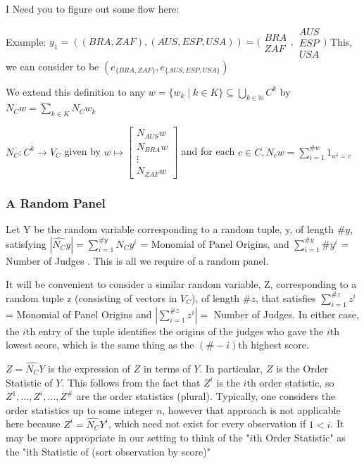 \documentclass{article}
\begin{document}
I Need you to figure out some flow here:

Example:
\( y_1 = (( BRA, ZAF) ,(AUS, ESP, USA)) = \bigg( \begin{matrix} BRA \\ ZAF \end{matrix}, \begin{matrix} AUS \\ ESP \\ USA \end{matrix}\bigg) \)  
This, we can consider to be $(e_{\{BRA,ZAF\}},e_{\{AUS,ESP,USA\}})$

We extend this definition to any $w =\{w_k \mid k \in K\} \subseteq \bigcup_{k\in\mathbb{N}} C^k $ by $N_C w = \sum_{k\in K} N_C w_k$

$N_C: C^k \rightarrow V_C $ given by $ w \mapsto \begin{bmatrix} N_{AUS}w \\ N_{BRA}w \\ \vdots \\ N_{ZAF}w \end{bmatrix} $ and for each $ c \in C, N_cw = \sum_{i=1}^{\#w} 1_{w^i = c} $

\subsubsection{A Random Panel}
Let Y be the random variable corresponding to a random tuple, y, of length $\#y$, satisfying $ |\hat{N_C}y|=\sum_{i=1}^{\#y} N_C y^i$ = Monomial of Panel Origins, and $\sum_{i=1}^{\#y} \#y^i $ = Number of Judges . This is all we require of a random panel. 

It will be convenient to consider a similar random variable, Z, corresponding to a random tuple z (consisting of vectors in $V_C$), of length $\#z$, that satisfies $\sum_{i=1}^{\#z} z^i$ = Monomial of Panel Origins and $|\sum_{i=1}^{\#z} z^i | = $ Number of Judges. In either case, the $i$th entry of the tuple identifies the origins of the judges who gave the  $i$th lowest score, which is the same thing as the $(\#-i)$th highest score. 

$Z = \hat{N_C}Y$ is the expression of $Z$ in terms of $Y$. In particular, $Z$ is the Order Statistic of $Y$. This follows from the fact that $Z^i$ is the $i$th order statistic, so $Z^1,\dots,Z^i,\dots,Z^{\#}$ are the order statistics (plural). Typically, one considers the order statistics up to some integer $n$, however that approach is not applicable here because $Z^i = \hat{N_C}Y^i$, which need not exist for every observation if $1<i$. It may be more appropriate in our setting to think of the "$i$th Order Statistic" as the "ith Statistic of (sort observation by score)"
\end{document}
